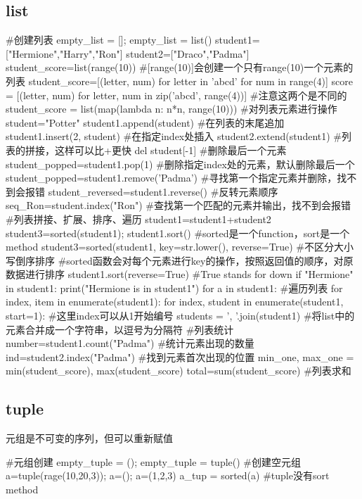   \subsection{list}
    \begin{codeblock}[language=python, caption={basic operations of list}]
      #创建列表
      empty_list = []; empty_list = list()
      student1=["Hermione","Harry","Ron"]
      student2=["Draco","Padma"]
      student_score=list(range(10)) #[range(10)]会创建一个只有range(10)一个元素的列表
      student_score=[(letter, num) for letter in 'abcd' for num in range(4)]
      score = [(letter, num) for letter, num in zip('abcd', range(4))] #注意这两个是不同的
      student_score = list(map(lambda n: n*n, range(10)))
      #对列表元素进行操作
      student="Potter"
      student1.append(student) #在列表的末尾追加
      student1.insert(2, student) #在指定index处插入
      student2.extend(student1) #列表的拼接，这样可以比+更快
      del student[-1] #删除最后一个元素
      student_popped=student1.pop(1) #删除指定index处的元素，默认删除最后一个
      student_popped=student1.remove('Padma') #寻找第一个指定元素并删除，找不到会报错
      student_reversed=student1.reverse() #反转元素顺序
      seq_Ron=student.index("Ron") #查找第一个匹配的元素并输出，找不到会报错
      #列表拼接、扩展、排序、遍历
      student1=student1+student2
      student3=sorted(student1); student1.sort() #sorted是一个function，sort是一个method
      student3=sorted(student1, key=str.lower(), reverse=True) #不区分大小写倒序排序
      #sorted函数会对每个元素进行key的操作，按照返回值的顺序，对原数据进行排序
      student1.sort(reverse=True) #True stands for down
      if "Hermione" in student1:
        print("Hermione is in student1")
      for a in student1: #遍历列表
      for index, item in enumerate(student1):
      for index, student in enumerate(student1, start=1): #这里index可以从1开始编号
      students = ', '.join(student1) #将list中的元素合并成一个字符串，以逗号为分隔符
      #列表统计
      number=student1.count("Padma") #统计元素出现的数量
      ind=student2.index("Padma") #找到元素首次出现的位置
      min_one, max_one = min(student_score), max(student_score)
      total=sum(student_score) #列表求和
    \end{codeblock}

  \subsection{tuple}
    元组是不可变的序列，但可以重新赋值
    \begin{codeblock}[language=python, caption={basic operation of tuple}]
      #元组创建
      empty_tuple = (); empty_tuple = tuple() #创建空元组
      a=tuple(rage(10,20,3)); a=(); a=(1,2,3)
      a_tup = sorted(a) #tuple没有sort method
    \end{codeblock}

